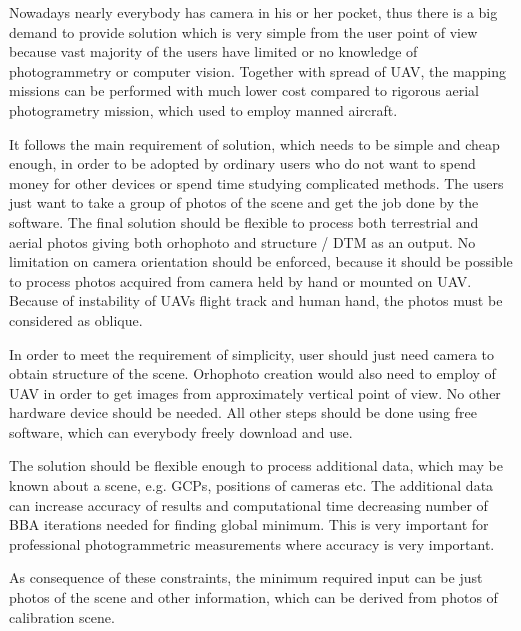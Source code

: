 \documentclass[a4paper,12pt]{article}
\begin{document}
Nowadays nearly everybody has camera in his or her pocket, thus there is a big demand 
to provide solution which is very simple from the user point of view because 
vast majority of the users have limited or no knowledge of photogrammetry or computer vision. 
Together with spread of UAV, the mapping missions can be performed with much lower 
cost compared to rigorous aerial photogrametry mission, which used to employ manned aircraft.


It follows the main requirement 
of solution, which needs to be simple and cheap enough,
in order to be adopted by
ordinary users who do not want 
to spend money for other devices or spend time studying complicated methods. 
The users just 
want to take a group of photos of the scene and get the job done by the software.
The final solution should be flexible to process both terrestrial and aerial photos
giving both orhophoto and structure / DTM as an output. 
No limitation on camera orientation should be enforced, because it should be possible 
to process photos acquired from camera held by hand or mounted on UAV.
Because of instability of UAVs flight track and human hand, the photos 
must be considered as oblique. 


In order to meet the requirement of simplicity, user should just need  
 camera to obtain structure of the scene. Orhophoto creation would also need to employ of UAV
in order to get images from approximately vertical point of view.
No other hardware device should be needed. 
All other steps should be done 
using free software, which can everybody freely download and use. 



The solution should be flexible enough to process additional data, which may be known about a scene, 
e.g. GCPs, positions of cameras etc. The additional data can
 increase accuracy of results and computational time  
 decreasing number of  BBA iterations needed for finding global minimum. This is very important 
 for professional photogrammetric measurements where accuracy is very important.

As consequence of these constraints, the minimum required input can be just photos
of the scene and other information, which can be derived from photos of calibration scene.
\end{document}
